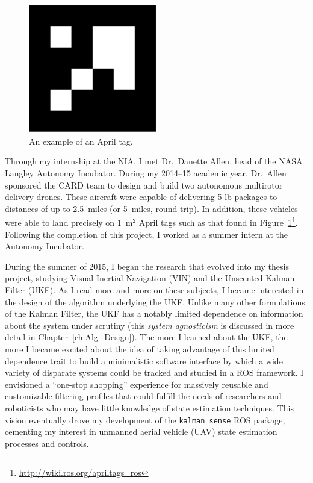 \begin{figure}
  \centering
    \includegraphics[width=0.5\textwidth]{april_tag}
  \caption[Example April tag]{An example of an April tag.}
  \label{fig:april_tag}
\end{figure}

Through my internship at the NIA, I met Dr.~Danette Allen, head of the NASA Langley Autonomy Incubator. During my 2014--15 academic year, Dr.~Allen sponsored the CARD team to design and build two autonomous multirotor delivery drones. These aircraft were capable of delivering 5\nobreakdash-lb packages to distances of up to 2.5~miles (or 5~miles, round trip). In addition, these vehicles were able to land precisely on 1~m$^2$ April tags such as that found in Figure~\ref{fig:april_tag}\footnote{\url{http://wiki.ros.org/apriltags\_ros}}. Following the completion of this project, I worked as a summer intern at the Autonomy Incubator.

During the summer of 2015, I began the research that evolved into my thesis project, studying Visual-Inertial Navigation (VIN) and the Unscented Kalman Filter (UKF). As I read more and more on these subjects, I became interested in the design of the algorithm underlying the UKF. Unlike many other formulations of the Kalman Filter, the UKF has a notably limited dependence on information about the system under scrutiny (this \textit{system agnosticism} is discussed in more detail in Chapter~\ref{ch:Alg_Design}). The more I learned about the UKF, the more I became excited about the idea of taking advantage of this limited dependence trait to build a minimalistic software interface by which a wide variety of disparate systems could be tracked and studied in a ROS framework. I envisioned a ``one-stop shopping'' experience for massively reusable and customizable filtering profiles that could fulfill the needs of researchers and roboticists who may have little knowledge of state estimation techniques. This vision eventually drove my development of the \texttt{kalman\_sense} ROS package, cementing my interest in unmanned aerial vehicle (UAV) state estimation processes and controls.


